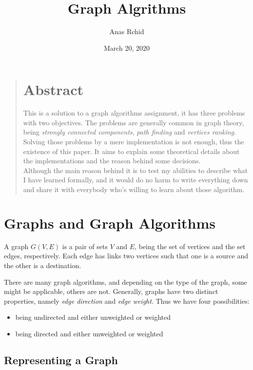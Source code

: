 \documentclass[12pt]{article}
\title{Graph Algrithms}
\author{Anas Rchid}
\date{March 20, 2020}
\begin{document}
\maketitle

\begin{quotation}
  \begin{center}
    \section*{Abstract}
  \end{center}
  This is a solution to a graph algorithms assignment, it has three problems with two objectives. The problems are generally common in graph theory, being \textit{strongly connected components}, \textit{path finding} and \textit{vertices ranking}. Solving those problems by a mere implementation is not enough, thus the existence of this paper. It aims to explain some theoretical details about the implementations and the reason behind some decisions. \\

  Although the main reason behind it is to test my abilities to describe what I have learned formally, and it would do no harm to write everything down and share it with everybody who's willing to learn about those algorithm.
\end{quotation}
\tableofcontents
\listofalgorithms
\clearpage
\section{Graphs and Graph Algorithms}

A graph $G(V,E)$ is a pair of sets $V$ and $E$, being the set of vertices and the set edges, respectively. Each edge has links two vertices such that one is a source and the other is a destination.

There are many graph algorithms, and depending on the type of the graph, some might be applicable, others are not.  Generally, graphs have two distinct properties, namely \textit{edge direction} and \textit{edge weight}. Thus we have four possibilities:

\begin{itemize}
\item being undirected and either unweighted or weighted
\item being directed and either unweighted or weighted
\end{itemize}

\subsection{Representing a Graph}
\end{document}
